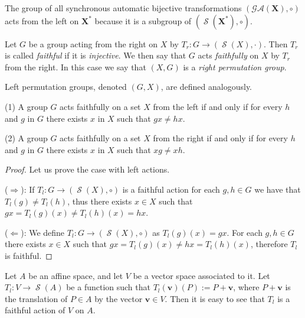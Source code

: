 \documentclass[mat1]{fmfdeloTS2.0}
\newcommand{\obs}{}				%
\newcommand{\word}{\mathbf}				%
\newcommand{\abece}{\mathbf{X}}			%
\newcommand{\fslovar}{\mathbf{X^*}}		%
\newcommand{\synaut}{\mathcal{GA}}	%
\DeclareMathOperator{\symm}{\mathcal{S}}		%
\begin{document}
\begin{example}\label{ex:synch action on abece}
The group of all synchronous automatic bijective transformations $(\synaut(\abece),\circ)$ acts from the left on $\fslovar$ because it is a subgroup of $(\symm(\fslovar),\circ)$.
\end{example}

\begin{definition}
Let $G$ be a group acting from the right on $X$ by $T_r:G\longrightarrow (\symm(X),\cdot)$. Then $T_r$ is called \emph{faithful} if it is \emph{injective}. We then say that $G$ acts \emph{faithfully} on $X$ by $T_r$ from the right. In this case we say that $(X,G)$ is a \emph{right permutation group}.

Left permutation groups, denoted $(G, X)$, are defined analogously.
\label{def:faithful actions}
\end{definition}

\begin{proposition}
(1) A group $G$ acts faithfully on a set $X$ from the left \obs{if and only if} for every $h$ and $g$ in $G$ there exists $x$ in $X$ such that $gx\neq hx$. 

(2) A group $G$ acts faithfully on a set $X$ from the right \obs{if and only if} for every $h$ and $g$ in $G$ there exists $x$ in $X$ such that $xg\neq xh$.
\end{proposition}\label{prop:faithful action}
\begin{proof}
Let us prove the case with left actions. 

($\Rightarrow$): If $T_l:G\longrightarrow (\symm(X),\circ)$ is a faithful action for each $g,h\in G$  we have that $T_l(g)\neq T_l(h)$, thus there exists $x\in X$ such that $gx=T_l(g)(x)\neq T_l(h)(x)=hx$.

($\Leftarrow$): We define $T_l:G\longrightarrow (\symm(X),\circ)$ as $T_l(g)(x)=gx$. For each $g,h\in G$ there exists $x\in X$ such that $gx=T_l(g)(x)\neq hx=T_l(h)(x)$, therefore $T_l$ is faithful.
\end{proof}

\begin{example}[translations]\label{ex:translation1}
Let $A$ be an affine space, and let $V$ be a vector space associated to it. Let $T_l:V\longrightarrow \symm(A)$ be a function such that $T_l(\word{v})(P):=P+\word{v}$, where $P+\word{v}$ is the translation of $P\in A$ by the vector $\word{v}\in V$. Then it is easy to see that $T_l$ is a faithful action of $V$ on $A$. 
\end{example}
\end{document}
